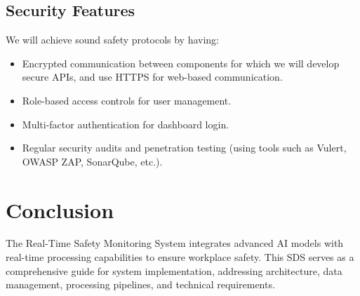 \documentclass[12pt]{article}
\begin{document}
\subsection{Security Features}
We will achieve sound safety protocols by having:
\begin{itemize}
    \item Encrypted communication between components for which we will develop secure APIs, and use HTTPS for web-based communication.
    \item Role-based access controls for user management.
    \item Multi-factor authentication for dashboard login.
    \item Regular security audits and penetration testing (using tools such as Vulert, OWASP ZAP, SonarQube, etc.).
\end{itemize}

\newpage
\section{Conclusion}
The Real-Time Safety Monitoring System integrates advanced AI models with real-time processing capabilities to ensure workplace safety. This SDS serves as a comprehensive guide for system implementation, addressing architecture, data management, processing pipelines, and technical requirements.
\end{document}
